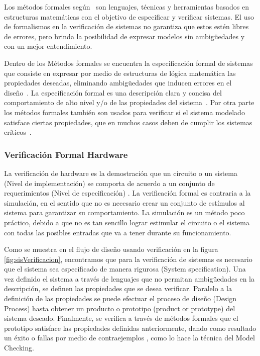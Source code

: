 Los m\'etodos formales seg\'un~\cite{Clarke1996} son lenguajes, t\'ecnicas y 
herramientas basados en estructuras matem\'aticas con el objetivo de especificar 
y verificar sistemas. El uso de formalismos en la verificaci\'on de sistemas no 
garantiza que estos est\'en libres de errores, pero brinda la posibilidad de 
expresar modelos sin ambig\"uedades y con un mejor entendimiento.

Dentro de los M\'etodos formales se encuentra la especificaci\'on formal de 
sistemas que consiste en expresar por medio de estructuras de l\'ogica 
matem\'atica las propiedades deseadas, eliminando ambig\"uedades que inducen 
errores en el dise\~no~\cite{Clarke1996}. La especificaci\'on formal es 
una descripci\'on clara y concisa del comportamiento de alto nivel y/o de las 
propiedades del sistema~\cite{Kropf1999}. Por otra parte los m\'etodos 
formales tambi\'en son usados para verificar si el sistema modelado satisface 
ciertas propiedades, que en muchos casos deben de cumplir los sistemas 
cr\'iticos~\cite{Clarke1996}.

\subsubsection{Verificaci\'on Formal Hardware}

La verificaci\'on de hardware es la demostraci\'on que un circuito o un sistema 
(Nivel de implementaci\'on) se comporta de acuerdo a un conjunto de 
requerimientos (Nivel de especificaci\'on) \cite{Kropf1999}. La 
verificaci\'on formal es contraria a la simulaci\'on, en el sentido que no es 
necesario crear un conjunto de est\'imulos al sistema para garantizar su 
comportamiento. La simulaci\'on es un m\'etodo poco pr\'actico, debido a que no 
es tan sencillo lograr estimular el circuito o el sistema con todas las posibles 
entradas que va a tener durante su funcionamiento. 

Como se muestra en el flujo de dise\~no usando verificaci\'on en la figura 
\ref{fig:sisVerificacion}, encontramos que para la verificaci\'on de sistemas 
es necesario que el sistema sea especificado de manera rigurosa (System 
specification). Una vez definido el sistema a trav\'es de lenguajes que no 
permitan ambig\"uedades en la descripci\'on,  se definen las propiedades que se 
desea verificar. Paralelo a la definici\'on de las propiedades se puede efectuar 
el proceso de dise\~no (Design Process) hasta obtener un producto o prototipo 
(product or prototype) del sistema deseado. Finalmente, se verifica a trav\'es 
de m\'etodos formales que el prototipo satisface las propiedades definidas 
anteriormente, dando como resultado un \'exito o fallas por medio de 
contraejemplos \cite{Vaovic2005}, como lo hace la t\'ecnica del Model 
Checking.

